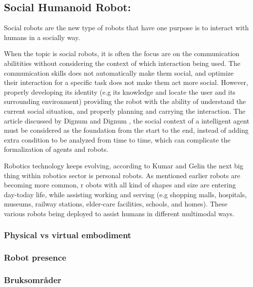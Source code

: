 \subsection{Social Humanoid Robot:}
Social robots are the new type of robots that have one purpose is to interact with humans in a socially way\cite{Lee}. 


When the topic is social robots, it is often the focus are on the communication abilitities without considering the context of which interaction being used. The communication skills does not automatically make them social, and optimize their interaction for a specific task does not make them act more social.  However, properly developing its identity (e.g its knowledge and locate the user and its surrounding environment) providing the robot with the ability  of understand the current social situation, and properly planning and carrying  the interaction. The article discussed by Dignum and Dignum \cite{dignum}, the social context of a intelligent agent  must be considered as the foundation from the start to the end, instead of adding extra condition to be analyzed  from time to time, which can complicate the formalization of agents and robots. 

Robotics technology keeps evolving, according to Kumar and Gelin \cite{Kumar} the next big thing within robotics sector is personal robots. As mentioned earlier robots are becoming more common, r
obots with all kind of shapes and size are entering day-today life, while assisting working and serving (e.g shopping malls, hospitals, museums, railway stations, elder-care facilities, schools, and homes). These various robots being deployed to assist humans in different multimodal ways.

\subsubsection{Physical vs virtual embodiment}


\subsubsection{Robot presence}



\subsubsection{Bruksområder}




